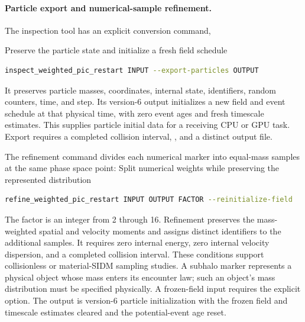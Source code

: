 \paragraph{Particle export and numerical-sample refinement.}
The inspection tool has an explicit conversion command,
\par\noindent\begin{minipage}{\linewidth}
{}
{Preserve the particle state and initialize a fresh field schedule}
\begin{lstlisting}[language=bash]
inspect_weighted_pic_restart INPUT --export-particles OUTPUT
\end{lstlisting}
\end{minipage}\par
It preserves particle masses, coordinates, internal state, identifiers,
random counters, time, and step. Its version-6 output initializes a new field
and event schedule at that physical time, with zero event ages and fresh
timescale estimates. This supplies particle initial data for a receiving
CPU or GPU task. Export requires a completed collision interval,
, and a distinct output file.

The refinement command divides each numerical marker into equal-mass
samples at the same phase space point:
{}
{Split numerical weights while preserving the represented distribution}
\begin{lstlisting}[language=bash]
refine_weighted_pic_restart INPUT OUTPUT FACTOR --reinitialize-field
\end{lstlisting}
The factor is an integer from 2 through 16. Refinement preserves the
mass-weighted spatial and velocity moments and assigns distinct identifiers
to the additional samples. It requires zero internal energy, zero internal
velocity dispersion, and a completed collision interval. These conditions
support collisionless or material-SIDM sampling studies. A subhalo
marker represents a physical object whose mass enters its encounter law;
such an object's mass distribution must be specified physically. A
frozen-field input requires the explicit  option.
The output is version-6 particle initialization with the frozen field and
timescale estimates cleared and the potential-event age reset.

